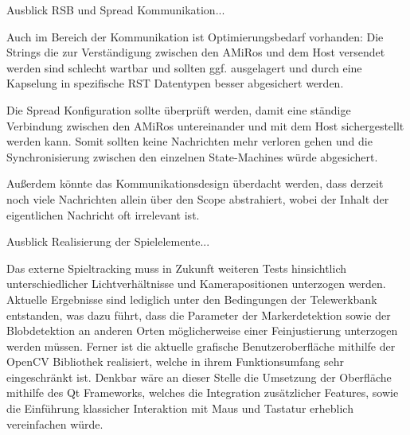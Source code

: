 Ausblick RSB und Spread Kommunikation...

Auch im Bereich der Kommunikation ist Optimierungsbedarf vorhanden: Die Strings die zur Verständigung zwischen den AMiRos und dem Host versendet werden sind schlecht wartbar und sollten ggf. ausgelagert und durch eine Kapselung in spezifische RST Datentypen besser abgesichert werden.

Die Spread Konfiguration sollte überprüft werden, damit eine ständige Verbindung zwischen den AMiRos untereinander und mit dem Host sichergestellt werden kann. Somit sollten keine Nachrichten mehr verloren gehen und die Synchronisierung zwischen den einzelnen State-Machines würde abgesichert.

Außerdem könnte das Kommunikationsdesign überdacht werden, dass derzeit noch viele Nachrichten allein über den Scope abstrahiert, wobei der Inhalt der eigentlichen Nachricht oft irrelevant ist. 

Ausblick Realisierung der Spielelemente...

Das externe Spieltracking muss in Zukunft weiteren Tests hinsichtlich unterschiedlicher Lichtverhältnisse und Kamerapositionen unterzogen werden. Aktuelle Ergebnisse sind lediglich unter den Bedingungen der Telewerkbank entstanden, was dazu führt, dass die Parameter der Markerdetektion sowie der Blobdetektion an anderen Orten möglicherweise einer Feinjustierung unterzogen werden müssen.
Ferner ist die aktuelle grafische Benutzeroberfläche mithilfe der OpenCV Bibliothek realisiert, welche in ihrem Funktionsumfang sehr eingeschränkt ist. Denkbar wäre an dieser Stelle die Umsetzung der Oberfläche mithilfe des Qt Frameworks, welches die Integration zusätzlicher Features, sowie die Einführung klassicher Interaktion mit Maus und Tastatur erheblich vereinfachen würde.